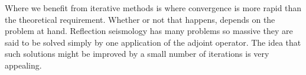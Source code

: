 
\par
Where we benefit from iterative methods is where convergence is more rapid than
the theoretical requirement.
Whether or not that happens, depends on the problem at hand.
Reflection seismology has many problems so massive they are said
to be solved simply by one application of the adjoint operator.
The idea that such solutions might be improved
by a small number of iterations is very appealing.


